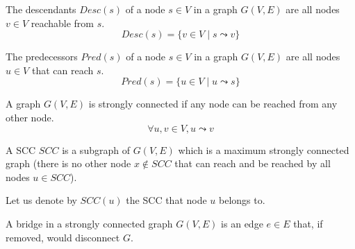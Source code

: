 \begin{definition}[Descendants] The descendants $Desc(s)$ of a node $s \in V$ in a graph $G(V,E)$ are all nodes $v \in V$ reachable from $s$.
    \begin{equation*}
        Desc(s) = \{v \in V \mid s \leadsto v\}
    \end{equation*}
\end{definition}
\begin{definition}[Predecessors] The predecessors $Pred(s)$ of a node $s \in V$ in a graph $G(V,E)$ are all nodes $u \in V$ that can reach $s$.
    \begin{equation*}
        Pred(s) = \{u \in V \mid u \leadsto s\}
    \end{equation*}
\end{definition}
\begin{definition}
    A graph $G(V, E)$ is strongly connected if any node can be reached from any other node.
    \begin{equation*}
        \forall u, v \in V, u \leadsto v
    \end{equation*}
\end{definition}
\begin{definition}
    A \acrlong*{SCC} $SCC$ is a subgraph of $G(V, E)$ which is a maximum strongly connected graph (there is no other node $x \not \in SCC$ that can reach and be reached by all nodes $u \in SCC$).
\end{definition}
Let us denote by $SCC(u)$ the \acrfull{SCC} that node $u$ belongs to.
\begin{definition}[Bridge]
    A bridge in a strongly connected graph $G(V,E)$ is an edge $e \in E$ that, if removed, would disconnect $G$.
\end{definition}
